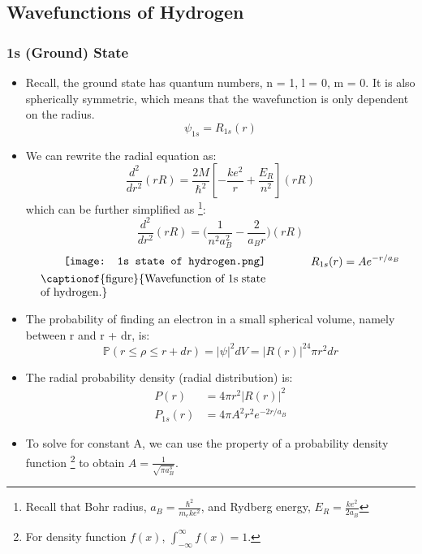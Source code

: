 \documentclass[12pt, letterpaper, twoside]{article}
\begin{document}
\subsection{Wavefunctions of Hydrogen}
\subsubsection{1s (Ground) State}

\begin{itemize}
    \item Recall, the ground state has quantum numbers, n = 1, l = 0, m = 0. It is also spherically symmetric, which means that the wavefunction is only dependent on the radius.
    \begin{equation*}
        \psi_{1s} = R_{1s}(r)
    \end{equation*}
    \item We can rewrite the radial equation as:
    \begin{equation*}
        \frac{d^2}{dr^2}(rR) = \frac{2M}{\hbar^2}[-\frac{ke^2}{r} + \frac{E_R}{n^2}](rR)
    \end{equation*}
    which can be further simplified as \footnote{Recall that Bohr radius, $a_B = \frac{\hbar^2}{m_eke^2}$, and Rydberg energy, $E_R = \frac{ke^2}{2a_B}$}:
    \begin{equation*}
        \frac{d^2}{dr^2}(rR) = \Big(\frac{1}{n^2a_B^2} - \frac{2}{a_Br}\Big)(rR)
    \end{equation*}
    \begin{align}
        \vcenter{\hbox{\texttt{[image: 1s state of hydrogen.png]}}}
        &\qquad\qquad
        \begin{aligned}
            R_{1s}(r) = Ae^{-r/a_B}
        \end{aligned}\\
        \vcenter{\hbox{\begin{minipage}{7cm}
        \captionof{figure}{Wavefunction of 1s state of hydrogen.}
        \end{minipage}}}
        & \notag
    \end{align}
    \item The probability of finding an electron in a small spherical volume, namely between r and r + dr, is:
    \begin{equation*}
        \mathbb{P}(r \leq \rho \leq r + dr) = |\psi|^2 dV = |R(r)|^24\pi r^2 dr
    \end{equation*}
    \item The radial probability density (radial distribution) is:
    \begin{align*}
        P(r) &= 4\pi r^2|R(r)|^2 \\
        P_{1s}(r) &= 4\pi A^2r^2e^{-2r/a_B}
    \end{align*}
    \item To solve for constant A, we can use the property of a probability density function \footnote{For density function $f(x)$, $\int_{-\infty}^{\infty}f(x) = 1$.} to obtain $A = \frac{1}{\sqrt{\pi a_B^3}}$.
\end{itemize}
\end{document}
